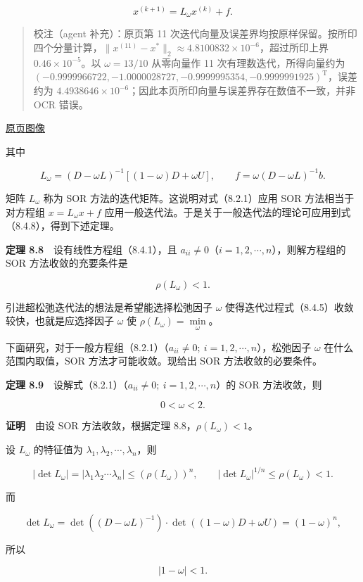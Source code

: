 \documentclass[
  10pt,
  fontset=fandol]{ctexart}
\begin{document}
\[
x^{(k+1)}=L_\omega x^{(k)}+f.
\tag{8.4.8}
\]

\begin{quote}
校注（agent 补充）：原页第 11 次迭代向量及误差界均按原样保留。按所印四个分量计算，\(\|x^{(11)}-x^*\|_2\approx4.8100832\times10^{-6}\)，超过所印上界 \(0.46\times10^{-5}\)。以 \(\omega=13/10\) 从零向量作 11 次有理数迭代，所得向量约为 \((-0.9999966722,-1.0000028727,-0.9999995354,-0.9999991925)^{\mathrm T}\)，误差约为 \(4.4938646\times10^{-6}\)；因此本页所印向量与误差界存在数值不一致，并非 OCR 错误。
\end{quote}

\href{../../source-images/pdf-228.jpeg}{原页图像}

其中

\[
L_\omega=(D-\omega L)^{-1}[(1-\omega)D+\omega U],\qquad f=\omega(D-\omega L)^{-1}b.
\]

矩阵 \(L_\omega\) 称为 SOR 方法的迭代矩阵。这说明对式（8.2.1）应用 SOR 方法相当于对方程组 \(x=L_\omega x+f\) 应用一般迭代法。于是关于一般迭代法的理论可应用到式（8.4.8），得到下述定理。

\textbf{定理 8.8}　设有线性方程组（8.4.1），且 \(a_{ii}\neq0\)（\(i=1,2,\cdots,n\)），则解方程组的 SOR 方法收敛的充要条件是

\[
\rho(L_\omega)<1.
\]

引进超松弛迭代法的想法是希望能选择松弛因子 \(\omega\) 使得迭代过程式（8.4.5）收敛较快，也就是应选择因子 \(\omega\) 使 \(\rho(L_\omega)=\min\limits_\omega\)。

下面研究，对于一般方程组（8.2.1）（\(a_{ii}\neq0;\ i=1,2,\cdots,n\)），松弛因子 \(\omega\) 在什么范围内取值，SOR 方法才可能收敛。现给出 SOR 方法收敛的必要条件。

\textbf{定理 8.9}　设解式（8.2.1）（\(a_{ii}\neq0;\ i=1,2,\cdots,n\)）的 SOR 方法收敛，则

\[
0<\omega<2.
\]

\textbf{证明}　由设 SOR 方法收敛，根据定理 8.8，\(\rho(L_\omega)<1\)。

设 \(L_\omega\) 的特征值为 \(\lambda_1,\lambda_2,\cdots,\lambda_n\)，则

\[
|\det L_\omega|=|\lambda_1\lambda_2\cdots\lambda_n|\leqslant(\rho(L_\omega))^n,\qquad
|\det L_\omega|^{1/n}\leqslant\rho(L_\omega)<1.
\]

而

\[
\det L_\omega=\det((D-\omega L)^{-1})\cdot\det((1-\omega)D+\omega U)=(1-\omega)^n,
\]

所以

\[
|1-\omega|<1.
\]
\end{document}

